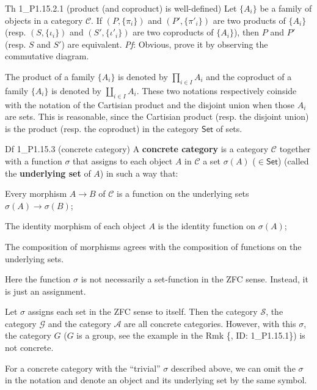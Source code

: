 \documentclass{article}
\begin{document}
\begin{Th}{Th 1\_P1.15.2.1 (product (and coproduct) is well-defined)}
    Let $\{A_i\}$ be a family of objects in a category $\mathscr{C}$. If $(P, \{\pi_i\})$ and $(P', \{\pi'_i\})$ are two products of $\{A_i\}$ (resp. $(S, \{\iota_i\})$ and $(S', \{\iota'_i\})$ are two coproducts of $\{A_i\}$), then $P$ and $P'$ (resp. $S$ and $S'$) are equivalent.
    \tcblower
    \textit{Pf}: Obvious, prove it by observing the commutative diagram.
\end{Th}

\begin{Rmk}{}
    \textcolor{Df}{The product of a family $\{A_i\}$ is denoted by $\prod_{i\in I} A_i$ and the coproduct of a family $\{A_i\}$ is denoted by $\coprod_{i\in I} A_i$.} These two notations respectively coinside with the notation of the Cartisian product and the disjoint union when those $A_i$ are sets. \textcolor{Th}{This is reasonable, since the Cartisian product (resp. the disjoint union) is the product (resp. the coproduct) in the category $\mathsf{Set}$ of sets.}
\end{Rmk}

\begin{Df}{Df 1\_P1.15.3 (concrete category)}
    A \textbf{concrete category} is a category $\mathscr{C}$ together with a function $\sigma$ that assigns to each object $A$ in $\mathscr{C}$ a set $\sigma(A)$ ($\in\mathsf{Set}$) (called the \textbf{underlying set} of $A$) in such a way that:
    \begin{compactenum}
        \item Every morphism $A\to B$ of $\mathscr{C}$ is a function on the underlying sets $\sigma(A)\to \sigma(B)$;
        \item The identity morphism of each object $A$ is the identity function on $\sigma(A)$;
        \item The composition of morphisms agrees with the composition of functions on the underlying sets.
    \end{compactenum}
\end{Df}

\begin{Rmk}{}
    \begin{compactenum}
        \item Here the function $\sigma$ is not necessarily a set-function in the ZFC sense. Instead, it is just an assignment.
        \item \textcolor{Th}{Let $\sigma$ assigns each set in the ZFC sense to itself. Then the category $\mathscr{S}$, the category $\mathscr{G}$ and the category $\mathscr{A}$ are all concrete categories. However, with this $\sigma$, the category $G$ ($G$ is a group, see the example in the Rmk \{, ID: 1\_P1.15.1\}) is not concrete.}
        \item For a concrete category with the ``trivial'' $\sigma$ described above, we can omit the $\sigma$ in the notation and denote an object and its underlying set by the same symbol. 
    \end{compactenum}
\end{Rmk}
\end{document}
